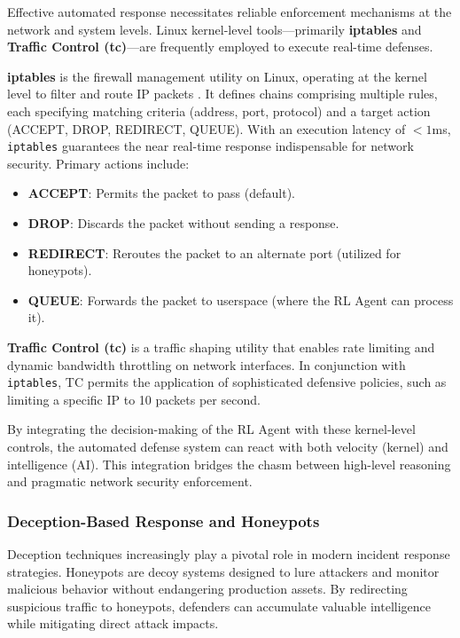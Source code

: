 \documentclass[12pt,a4paper]{report}
\begin{document}
Effective automated response necessitates reliable enforcement mechanisms at the network and system levels. Linux kernel-level tools—primarily \textbf{iptables} and \textbf{Traffic Control (tc)}—are frequently employed to execute real-time defenses.

\textbf{iptables} is the firewall management utility on Linux, operating at the kernel level to filter and route IP packets \cite{kroah2006linux}. It defines chains comprising multiple rules, each specifying matching criteria (address, port, protocol) and a target action (ACCEPT, DROP, REDIRECT, QUEUE). With an execution latency of $< 1$ms, \texttt{iptables} guarantees the near real-time response indispensable for network security. Primary actions include:

\begin{itemize}
    \item \textbf{ACCEPT}: Permits the packet to pass (default).
    \item \textbf{DROP}: Discards the packet without sending a response.
    \item \textbf{REDIRECT}: Reroutes the packet to an alternate port (utilized for honeypots).
    \item \textbf{QUEUE}: Forwards the packet to userspace (where the RL Agent can process it).
\end{itemize}

\textbf{Traffic Control (tc)} is a traffic shaping utility that enables rate limiting and dynamic bandwidth throttling on network interfaces. In conjunction with \texttt{iptables}, TC permits the application of sophisticated defensive policies, such as limiting a specific IP to 10 packets per second.

By integrating the decision-making of the RL Agent with these kernel-level controls, the automated defense system can react with both velocity (kernel) and intelligence (AI). This integration bridges the chasm between high-level reasoning and pragmatic network security enforcement.

\subsubsection*{Deception-Based Response and Honeypots}

Deception techniques increasingly play a pivotal role in modern incident response strategies. Honeypots are decoy systems designed to lure attackers and monitor malicious behavior without endangering production assets. By redirecting suspicious traffic to honeypots, defenders can accumulate valuable intelligence while mitigating direct attack impacts.
\end{document}
